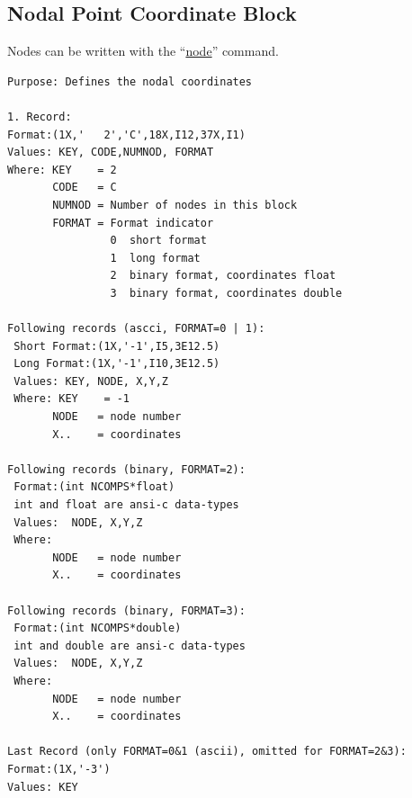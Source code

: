 \documentclass{article}
\providecommand{\htmlref}[2]{\hyperref[#2]{#1}}
\begin{document}
\subsection{\label{Nodal Point Coordinate Block}Nodal Point Coordinate Block}
Nodes can be written with the ``\htmlref{node}{node}'' command.
\begin{verbatim}
Purpose: Defines the nodal coordinates

1. Record:
Format:(1X,'   2','C',18X,I12,37X,I1)
Values: KEY, CODE,NUMNOD, FORMAT
Where: KEY    = 2
       CODE   = C
       NUMNOD = Number of nodes in this block
       FORMAT = Format indicator
                0  short format
                1  long format 
                2  binary format, coordinates float 
                3  binary format, coordinates double 

Following records (ascci, FORMAT=0 | 1):
 Short Format:(1X,'-1',I5,3E12.5)
 Long Format:(1X,'-1',I10,3E12.5)
 Values: KEY, NODE, X,Y,Z
 Where: KEY    = -1
       NODE   = node number
       X..    = coordinates

Following records (binary, FORMAT=2):
 Format:(int NCOMPS*float)
 int and float are ansi-c data-types
 Values:  NODE, X,Y,Z
 Where: 
       NODE   = node number
       X..    = coordinates

Following records (binary, FORMAT=3):
 Format:(int NCOMPS*double)
 int and double are ansi-c data-types
 Values:  NODE, X,Y,Z
 Where: 
       NODE   = node number
       X..    = coordinates
  
Last Record (only FORMAT=0&1 (ascii), omitted for FORMAT=2&3):
Format:(1X,'-3')
Values: KEY
\end{verbatim}
\end{document}
